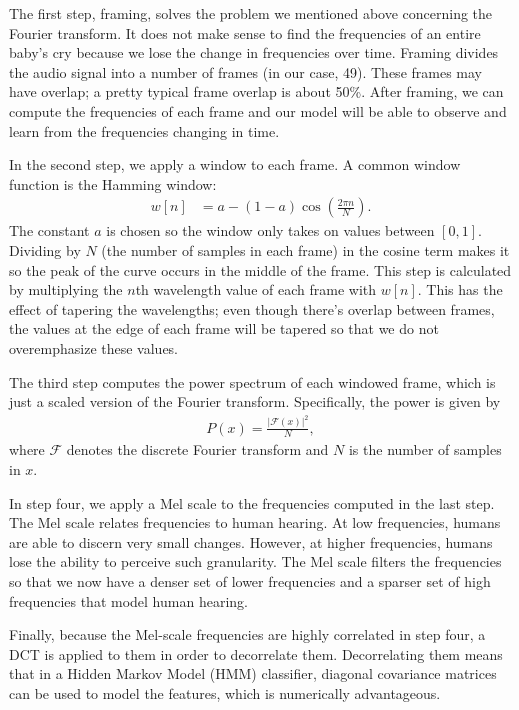 \documentclass[11pt]{article}
\begin{document}
The first step, framing, solves the problem we mentioned above concerning the Fourier transform.
It does not make sense to find the frequencies of an entire baby's cry because we lose the change in frequencies over time.
Framing divides the audio signal into a number of frames (in our case, 49).
These frames may have overlap; a pretty typical frame overlap is about 50\%.
After framing, we can compute the frequencies of each frame and our model will be able to observe and learn from the frequencies changing in time.

In the second step, we apply a window to each frame.
A common window function is the Hamming window: \begin{align*}
    w[n] &= a - (1 - a) \cos \left ( \frac{2 \pi n}{N} \right).
\end{align*}
The constant $ a $ is chosen so the window only takes on values between $ [0, 1] $.
Dividing by $ N $ (the number of samples in each frame) in the cosine term makes it so the peak of the curve occurs in the middle of the frame.
This step is calculated by multiplying the $ n $th wavelength value of each frame with $ w[n] $.
This has the effect of tapering the wavelengths; even though there's overlap between frames, the values at the edge of each frame will be tapered so that we do not overemphasize these values.

The third step computes the power spectrum of each windowed frame, which is just a scaled version of the Fourier transform.
Specifically, the power is given by \begin{align*}
    P(x) = \frac{|\mathscr{F}(x)|^2}{N},
\end{align*}
where $ \mathscr{F} $ denotes the discrete Fourier transform and $ N $ is the number of samples in $ x $.

In step four, we apply a Mel scale to the frequencies computed in the last step.
The Mel scale relates frequencies to human hearing.
At low frequencies, humans are able to discern very small changes.
However, at higher frequencies, humans lose the ability to perceive such granularity.
The Mel scale filters the frequencies so that we now have a denser set of lower frequencies and a sparser set of high frequencies that model human hearing.

Finally, because the Mel-scale frequencies are highly correlated in step four, a DCT is applied to them in order to decorrelate them.
Decorrelating them means that in a Hidden Markov Model (HMM) classifier, diagonal covariance matrices can be used to model the features, which is numerically advantageous.
\end{document}
